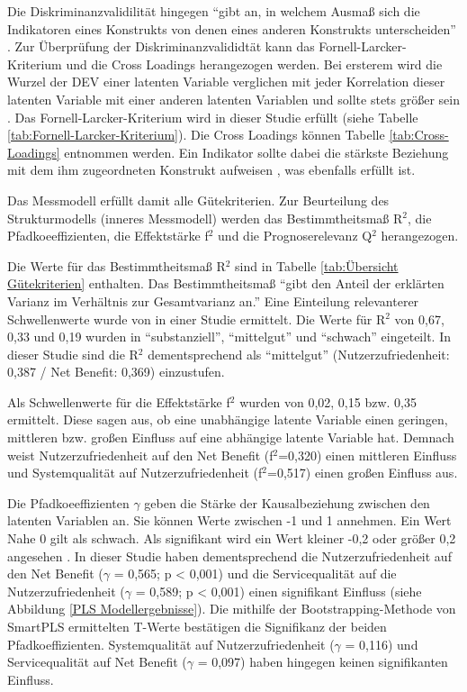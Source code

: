 Die Diskriminanzvalidilität hingegen "`gibt an, in welchem Ausmaß sich die Indikatoren eines Konstrukts von denen eines anderen Konstrukts unterscheiden"' \parencite[S.26]{nitzl2010anwenderorientierte}. Zur Überprüfung der Diskriminanzvalididtät kann das Fornell-Larcker-Kriterium und die Cross Loadings herangezogen werden. 
Bei ersterem wird die Wurzel der DEV einer latenten Variable verglichen mit jeder Korrelation dieser latenten Variable mit einer anderen latenten Variablen und sollte stets größer sein \parencite[vgl.][S.26]{nitzl2010anwenderorientierte}. Das Fornell-Larcker-Kriterium wird in dieser Studie erfüllt (siehe Tabelle \ref{tab:Fornell-Larcker-Kriterium}). Die Cross Loadings können Tabelle \ref{tab:Cross-Loadings} entnommen werden. Ein Indikator sollte dabei die stärkste Beziehung mit dem ihm zugeordneten Konstrukt aufweisen \parencite[vgl.][S.26]{nitzl2010anwenderorientierte}, was ebenfalls erfüllt ist.   \nocite{fornell1981evaluating}

Das Messmodell erfüllt damit alle Gütekriterien. Zur Beurteilung des Strukturmodells (inneres Messmodell) werden das Bestimmtheitsmaß R$^2$, die Pfadkoeeffizienten, die Effektstärke f$^2$ und die Prognoserelevanz Q$^2$ herangezogen.  

Die Werte für das Bestimmtheitsmaß R$^2$ sind in Tabelle \ref{tab:Übersicht Gütekriterien} enthalten. Das Bestimmtheitsmaß "`gibt den Anteil der erklärten Varianz im Verhältnis zur Gesamtvarianz an."' \parencite[S.32]{nitzl2010anwenderorientierte} Eine Einteilung relevanterer Schwellenwerte wurde von \cite[S.323]{chin1998partial} in einer Studie ermittelt. Die Werte für R$^2$ von 0,67, 0,33 und 0,19 wurden in "`substanziell"', "`mittelgut"' und "`schwach"' eingeteilt. In dieser Studie sind die R$^2$ dementsprechend als "`mittelgut"' (Nutzerzufriedenheit: 0,387 / Net Benefit: 0,369) einzustufen.

Als Schwellenwerte für die Effektstärke f$^2$ wurden von \cite[S.316f.]{chin1998partial} 0,02, 0,15 bzw. 0,35 ermittelt. Diese sagen aus, ob eine unabhängige latente Variable einen geringen, mittleren bzw. großen Einfluss auf eine abhängige latente Variable hat. Demnach weist Nutzerzufriedenheit auf den Net Benefit (f$^2$=0,320) einen mittleren Einfluss und Systemqualität auf Nutzerzufriedenheit (f$^2$=0,517) einen großen Einfluss aus. 

Die Pfadkoeeffizienten $\gamma$ geben die Stärke der Kausalbeziehung zwischen den latenten Variablen an. Sie können Werte zwischen -1 und 1 annehmen. Ein Wert Nahe 0 gilt als schwach. Als signifikant wird ein Wert kleiner -0,2 oder größer 0,2 angesehen \parencite[vgl.][S.11]{chin1998commentary}. In dieser Studie haben dementsprechend die Nutzerzufriedenheit auf den Net Benefit ($\gamma$ = 0,565; p < 0,001) und die Servicequalität auf die Nutzerzufriedenheit ($\gamma$ = 0,589; p < 0,001) einen signifikant Einfluss (siehe Abbildung \ref{PLS Modellergebnisse}). Die mithilfe der Bootstrapping-Methode von SmartPLS ermittelten T-Werte bestätigen die Signifikanz der beiden Pfadkoeffizienten. Systemqualität auf Nutzerzufriedenheit ($\gamma$ = 0,116) und Servicequalität auf Net Benefit ($\gamma$ = 0,097) haben hingegen keinen signifikanten Einfluss. 

